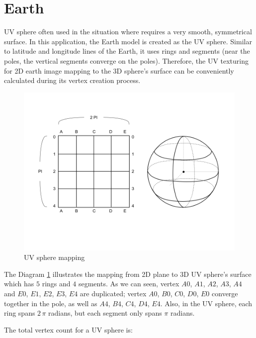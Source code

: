 \section{Earth}
\label{section:earth}

UV sphere often used in the situation where requires a very smooth, symmetrical surface. In this application, the Earth model is created as the UV sphere. Similar to latitude and longitude lines of the Earth, it uses rings and segments (near the poles, the vertical segments converge on the poles). Therefore, the UV texturing for 2D earth image mapping to the 3D sphere's surface can be conveniently calculated during its vertex creation process.

\begin{figure}[H]
\caption{UV sphere mapping}
\label{fig:uv-sphere-mapping}
\centering
\includegraphics[width=\textwidth, keepaspectratio]{Figures/uv-sphere-mapping.png}
\decoRule
\end{figure}

The Diagram \ref{fig:uv-sphere-mapping} illustrates the mapping from 2D plane to 3D UV sphere's surface which has $5$ rings and $4$ segments. As we can seen, vertex $A0$, $A1$, $A2$, $A3$, $A4$ and $E0$, $E1$, $E2$, $E3$, $E4$ are duplicated; vertex $A0$, $B0$, $C0$, $D0$, $E0$ converge together in the pole, as well as $A4$, $B4$, $C4$, $D4$, $E4$. Also, in the UV sphere, each ring spans $2\,\pi$ radians, but each segment only spans $\pi$ radians.

The total vertex count for a UV sphere is:

